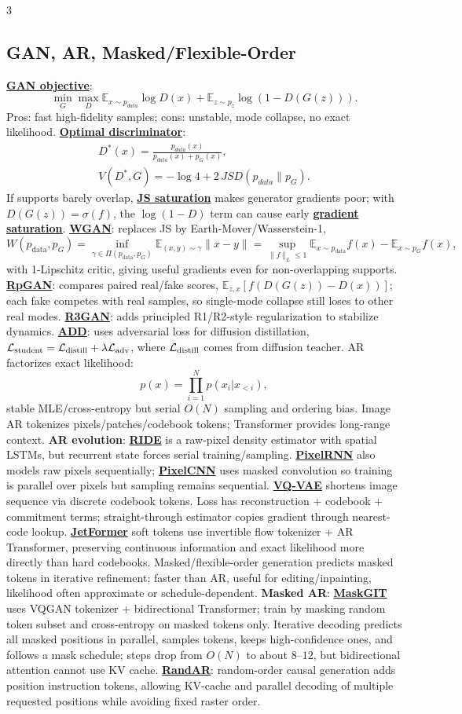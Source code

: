 \documentclass{article}
\numberwithin{equation}{subsection}
\newcommand{\key}[1]{\textbf{#1}}
\newcommand{\lowterm}[1]{\textbf{\underline{#1}}}
\newcommand{\E}{\mathbb{E}}
\begin{document}
\begin{multicols*}{3}
\subsection{GAN, AR, Masked/Flexible-Order}
\lowterm{GAN objective}:
\[
\min_G\max_D\E_{x\sim p_{data}}\log D(x)+\E_{z\sim p_z}\log(1-D(G(z))).
\]
Pros: fast high-fidelity samples; cons: unstable, mode collapse, no exact likelihood. \lowterm{Optimal discriminator}:
\[
\begin{gathered}
D^*(x)=\frac{p_{data}(x)}{p_{data}(x)+p_G(x)},\\
V(D^*,G)=-\log4+2\,JSD(p_{data}\|p_G).
\end{gathered}
\]
If supports barely overlap, \lowterm{JS saturation} makes generator gradients poor; with $D(G(z))=\sigma(f)$, the $\log(1-D)$ term can cause early \lowterm{gradient saturation}. \lowterm{WGAN}: replaces JS by Earth-Mover/Wasserstein-1,
\[
W(p_{\text{data}},p_G)=
\inf_{\gamma\in\Pi(p_{\text{data}},p_G)}\E_{(x,y)\sim\gamma}\|x-y\|
=\sup_{\|f\|_L\le1}\E_{x\sim p_{\text{data}}}f(x)-\E_{x\sim p_G}f(x),
\]
with 1-Lipschitz critic, giving useful gradients even for non-overlapping supports. \lowterm{RpGAN}: compares paired real/fake scores, $\E_{z,x}[f(D(G(z))-D(x))]$; each fake competes with real samples, so single-mode collapse still loses to other real modes. \lowterm{R3GAN}: adds principled R1/R2-style regularization to stabilize dynamics. \lowterm{ADD}: uses adversarial loss for diffusion distillation, $\mathcal L_{\rm student}=\mathcal L_{\rm distill}+\lambda\mathcal L_{\rm adv}$, where $\mathcal L_{\rm distill}$ comes from diffusion teacher. AR factorizes exact likelihood:
\[
p(x)=\prod_{i=1}^N p(x_i|x_{<i}),
\]
stable MLE/cross-entropy but serial $O(N)$ sampling and ordering bias. Image AR tokenizes pixels/patches/codebook tokens; Transformer provides long-range context. \key{AR evolution}: \lowterm{RIDE} is a raw-pixel density estimator with spatial LSTMs, but recurrent state forces serial training/sampling. \lowterm{PixelRNN} also models raw pixels sequentially; \lowterm{PixelCNN} uses masked convolution so training is parallel over pixels but sampling remains sequential. \lowterm{VQ-VAE} shortens image sequence via discrete codebook tokens. Loss has reconstruction + codebook + commitment terms; straight-through estimator copies gradient through nearest-code lookup. \lowterm{JetFormer} soft tokens use invertible flow tokenizer + AR Transformer, preserving continuous information and exact likelihood more directly than hard codebooks.
Masked/flexible-order generation predicts masked tokens in iterative refinement; faster than AR, useful for editing/inpainting, likelihood often approximate or schedule-dependent. \key{Masked AR}: \lowterm{MaskGIT} uses VQGAN tokenizer + bidirectional Transformer; train by masking random token subset and cross-entropy on masked tokens only. Iterative decoding predicts all masked positions in parallel, samples tokens, keeps high-confidence ones, and follows a mask schedule; steps drop from $O(N)$ to about $8$--$12$, but bidirectional attention cannot use KV cache. \lowterm{RandAR}: random-order causal generation adds position instruction tokens, allowing KV-cache and parallel decoding of multiple requested positions while avoiding fixed raster order. 
\end{multicols*}
\end{document}
